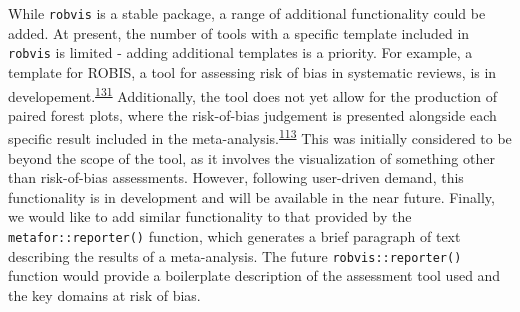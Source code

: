 \documentclass[a4paper, twoside]{templates/ociamthesis}
\newcommand*{\bibtitle}{Bibliography}
\begin{document}
While \texttt{robvis} is a stable package, a range of additional functionality could be added. At present, the number of tools with a specific template included in \texttt{robvis} is limited - adding additional templates is a priority. For example, a template for ROBIS, a tool for assessing risk of bias in systematic reviews, is in developement.\textsuperscript{\protect\hyperlink{ref-whiting2016robis}{131}} Additionally, the tool does not yet allow for the production of paired forest plots, where the risk-of-bias judgement is presented alongside each specific result included in the meta-analysis.\textsuperscript{\protect\hyperlink{ref-cochranechpt7}{113}} This was initially considered to be beyond the scope of the tool, as it involves the visualization of something other than risk-of-bias assessments. However, following user-driven demand, this functionality is in development and will be available in the near future. Finally, we would like to add similar functionality to that provided by the \texttt{metafor::reporter()} function, which generates a brief paragraph of text describing the results of a meta-analysis. The future \texttt{robvis::reporter()} function would provide a boilerplate description of the assessment tool used and the key domains at risk of bias.


\setlength{\baselineskip}{0pt} %

{\renewcommand*\MakeUppercase[1]{#1}%
\printbibliography[heading=bibintoc,title={\bibtitle}]}
\end{document}

